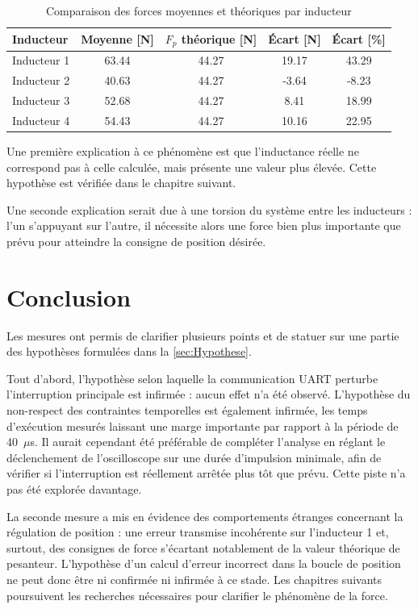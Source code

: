 \begin{table}[H]
    \centering
    \begin{tabular}{l cccc}
        \toprule
        \textbf{Inducteur} & \textbf{Moyenne [N]} & \textbf{$F_p$ théorique [N]} & \textbf{Écart [N]} & \textbf{Écart [\%]} \\
        \midrule
        Inducteur 1        & 63.44                & 44.27                        & 19.17              & 43.29               \\
        Inducteur 2        & 40.63                & 44.27                        & -3.64              & -8.23               \\
        Inducteur 3        & 52.68                & 44.27                        & 8.41               & 18.99               \\
        Inducteur 4        & 54.43                & 44.27                        & 10.16              & 22.95               \\
        \bottomrule
    \end{tabular}
    \caption{Comparaison des forces moyennes et théoriques par inducteur}
    \label{tab:forces_inducteurs}
\end{table}

Une première explication à ce phénomène est que l'inductance réelle ne correspond pas à celle calculée, mais présente une valeur plus élevée. Cette hypothèse est vérifiée dans le chapitre suivant.

Une seconde explication serait due à une torsion du système entre les inducteurs : l'un s'appuyant sur l'autre, il nécessite alors une force bien plus importante que prévu pour atteindre la consigne de position désirée.

\section{Conclusion}
Les mesures ont permis de clarifier plusieurs points et de statuer sur une partie des hypothèses formulées dans la \autoref{sec:Hypothese}.

Tout d'abord, l'hypothèse selon laquelle la communication UART perturbe l'interruption principale est infirmée : aucun effet n'a été observé. L'hypothèse du non-respect des contraintes temporelles est également infirmée, les temps d'exécution mesurés laissant une marge importante par rapport à la période de 40~$\mu$s. Il aurait cependant été préférable de compléter l'analyse en réglant le déclenchement de l'oscilloscope sur une durée d'impulsion minimale, afin de vérifier si l'interruption est réellement arrêtée plus tôt que prévu. Cette piste n'a pas été explorée davantage.

La seconde mesure a mis en évidence des comportements étranges concernant la régulation de position : une erreur transmise incohérente sur l'inducteur 1 et, surtout, des consignes de force s'écartant notablement de la valeur théorique de pesanteur. L'hypothèse d'un calcul d'erreur incorrect dans la boucle de position ne peut donc être ni confirmée ni infirmée à ce stade. Les chapitres suivants poursuivent les recherches nécessaires pour clarifier le phénomène de la force.